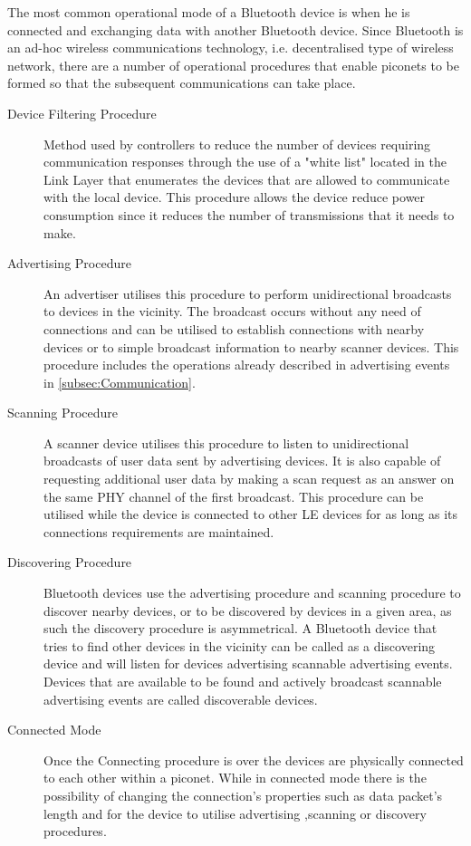 The most common operational mode of a Bluetooth device is when he is connected and exchanging data with another Bluetooth device. Since Bluetooth is an ad-hoc wireless communications technology, i.e. decentralised type of wireless network, there are a number of operational procedures that enable piconets to be formed so that the subsequent communications can take place.

\begin{description}
\item [Device Filtering Procedure] Method used by controllers to reduce the number of devices requiring communication responses through the use of a "white list" located in the Link Layer that enumerates the devices that are allowed to communicate with the local device. This procedure allows the device reduce power consumption since it reduces the number of transmissions that it needs to make.

\item [Advertising Procedure] An advertiser utilises this procedure to perform unidirectional broadcasts to devices in the vicinity. The broadcast occurs without any need of connections and can be utilised to establish connections with nearby devices or to simple broadcast information to nearby scanner devices. This procedure includes the operations already described in advertising events in \ref{subsec:Communication}.

\item [Scanning Procedure] A scanner device utilises this procedure to listen to unidirectional broadcasts of user data sent by advertising devices. It is also capable of requesting additional user data by making a scan request as an answer on the same \ac{PHY} channel of the first broadcast. This procedure can be utilised while the device is connected to other \ac{LE} devices for as long as its connections requirements are maintained.

\item [Discovering Procedure] Bluetooth devices use the advertising procedure and scanning procedure to discover nearby devices, or to be discovered by devices in a given area, as such the discovery procedure is asymmetrical. A Bluetooth device that tries to find other devices in the vicinity can be called as a discovering device and will listen for devices advertising scannable advertising events. Devices that are available to be found and actively broadcast scannable advertising events are called discoverable devices. 

\item[ Connected Mode] Once the Connecting procedure is over the devices are physically connected to each other within a piconet. While in connected mode there is the possibility of changing the connection's properties such as data packet's length and for the device to utilise advertising ,scanning or discovery procedures.


\end{description}

